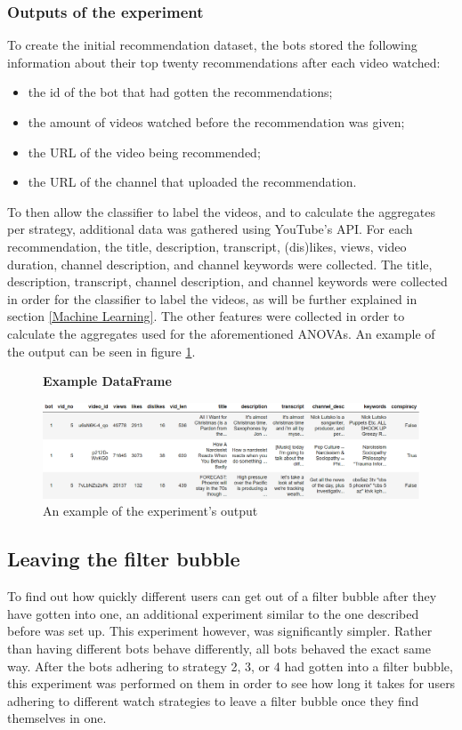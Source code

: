 \documentclass[../main.tex]{subfiles}
\begin{document}
\subsubsection{Outputs of the experiment}
To create the initial recommendation dataset, the bots stored the following information about their top 
twenty recommendations after each video watched: 
\begin{itemize}
    \item the id of the bot that had gotten the recommendations;
    \item the amount of videos watched before the recommendation was given;
    \item the URL of the video being recommended;
    \item the URL of the channel that uploaded the recommendation.
\end{itemize}
To then allow the classifier to label the videos, and to calculate the aggregates per strategy, additional 
data was gathered using YouTube's API. For each recommendation, the title, description, transcript, 
(dis)likes, views, video duration, channel description, and channel keywords were collected. The title, 
description, transcript, channel description, and channel keywords were collected in order for the 
classifier to label the videos, as will be further explained in section \ref{Machine Learning}. The other 
features were collected in order to calculate the aggregates used for the aforementioned ANOVAs. An example of the output can be seen in figure \ref{fig:DF_example}.

\begin{figure}[t]
  \textbf{Example DataFrame}\par\medskip
  \centering
  \includegraphics[keepaspectratio, width=\textwidth]{images/df_example.png}
  \caption{An example of the experiment's output}
  \label{fig:DF_example}
\end{figure}

\subsection{Leaving the filter bubble}
To find out how quickly different users can get out of a filter bubble after they have gotten into one,
an additional experiment similar to the one described before was set up. This experiment however, was 
significantly simpler. Rather than having different bots behave differently, all bots behaved the exact same
way. After the bots adhering to strategy 2, 3, or 4 had gotten into a filter bubble, this experiment was 
performed on them in order to see how long it takes for users adhering to different watch strategies to 
leave a filter bubble once they find themselves in one. 
\end{document}
